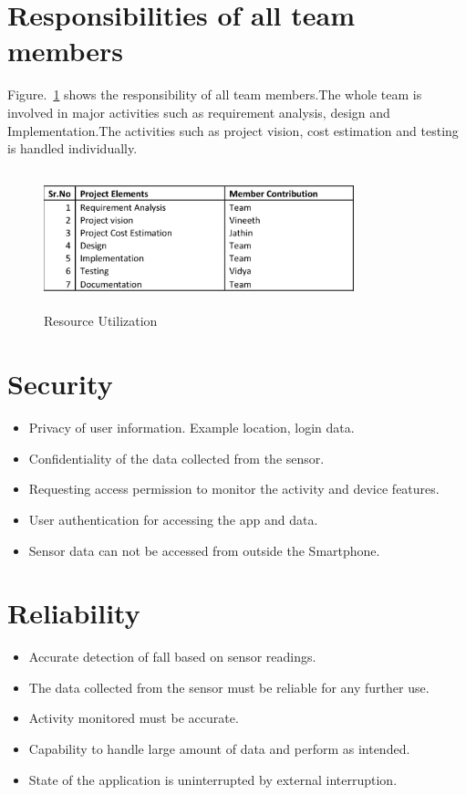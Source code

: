 \documentclass[conference]{IEEEtran}
\begin{document}
\section{Responsibilities of all team members}
Figure.~\ref{fig3} shows the responsibility of all team members.The whole team is involved in major activities such as requirement analysis, design and Implementation.The activities such as project vision, cost estimation and testing is handled individually.  
\begin{figure}
\centerline{\includegraphics[width=9cm,height=4cm]{resourceUtilization.png}}
\caption{Resource Utilization}
\label{fig3}
\end{figure}

\section{Security}
\begin{itemize}
\item Privacy of user information. Example location, login data.
\item Confidentiality of the data collected from the sensor.
\item Requesting access permission to monitor the activity and device features.
\item User authentication for accessing the app and data. 
\item Sensor data can not be accessed from outside the Smartphone.
\end{itemize}

\section{Reliability}
\begin{itemize}
\item Accurate detection of fall based on sensor readings.
\item The data collected from the sensor must be reliable for any further use.
\item Activity monitored must be accurate.
\item Capability to handle large amount of data and perform as intended.
\item State of the application is uninterrupted by external interruption.
\end{itemize}
\end{document}
